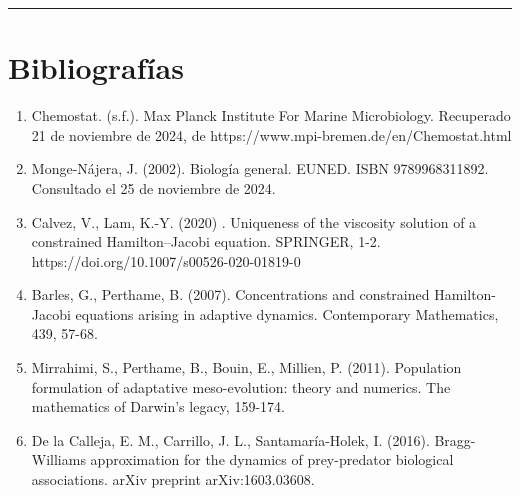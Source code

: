 \documentclass[letterpaper]{article}
\begin{document}
    \vspace{0.2cm}
        \rule{150mm}{0.5mm} %
    \vspace{0.2cm}

    	
    \section{Bibliografías}

    \begin{enumerate}
        \item {

            \normalsize{Chemostat. (s.f.). Max Planck Institute For Marine Microbiology. Recuperado 21 de noviembre de 2024, de https://www.mpi-bremen.de/en/Chemostat.html}

        }

        \item {

            \normalsize{Monge-Nájera, J. (2002). Biología general. EUNED. ISBN 9789968311892. Consultado el 25 de noviembre de 2024.}
        
        }

        \item{
            \normalsize{Calvez, V., Lam, K.-Y. (2020) . Uniqueness of the viscosity solution of a constrained Hamilton–Jacobi equation. SPRINGER, 1-2. https://doi.org/10.1007/s00526-020-01819-0} 
        }

        \item {
            \normalsize{Barles, G., Perthame, B. (2007). Concentrations and constrained Hamilton-Jacobi equations arising in adaptive dynamics. Contemporary Mathematics, 439, 57-68.}
        }

        \item{
            \normalsize{Mirrahimi, S., Perthame, B., Bouin, E., Millien, P. (2011). Population formulation of adaptative meso-evolution: theory and numerics. The mathematics of Darwin’s legacy, 159-174.}
        }

        \item{
            \normalsize{De la Calleja, E. M., Carrillo, J. L., Santamaría-Holek, I. (2016). Bragg-Williams approximation for the dynamics of prey-predator biological associations. arXiv preprint arXiv:1603.03608.}
        }
    \end{enumerate}
\end{document}
